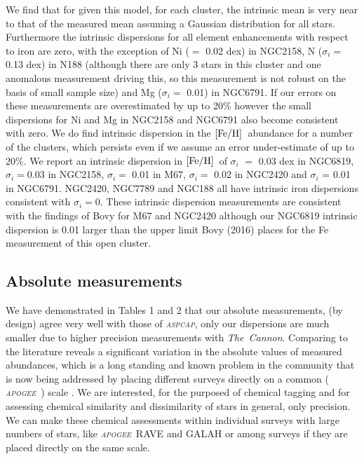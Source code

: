 \documentclass[14pt, preprint2]{aastex6}
\newcommand{\project}[1]{\textsl{#1}}
\newcommand{\tc}{\project{The~Cannon}}
\newcommand{\apogee}{\project{\textsc{apogee}}}
\newcommand{\aspcap}{\project{\textsc{aspcap}}}
\newcommand{\feh}{\mbox{$\rm [Fe/H]$}}
\begin{document}
We find that for given this model, for each cluster, the intrinsic mean is very near to that of the measured mean assuming a Gaussian distribution for all stars. Furthermore the intrinsic dispersions for all element enhancements with respect to iron are zero, with the exception of Ni ($=$ 0.02 dex) in NGC2158, N ($\sigma_i$$=$ 0.13 dex) in N188 (although there are only 3 stars in this cluster and one anomalous measurement driving this, so this measurement is not robust on the basis of small sample size) and Mg ($\sigma_i$$=$ 0.01) in NGC6791. If our errors on these measurements are overestimated by up to 20\% however the small dispersions for Ni and Mg in NGC2158 and NGC6791 also become consistent with zero. We do find intrinsic dispersion in the \feh\ abundance for a number of the clusters, which persists even if we assume an error under-estimate of up to 20\%. We report an intrinsic dispersion in \feh\ of $\sigma_i$ $=$ 0.03 dex in NGC6819, $\sigma_i$$=$0.03 in NGC2158, $\sigma_i$$=$ 0.01 in M67,  $\sigma_i$$=$ 0.02 in NGC2420 and $\sigma_i$ = 0.01 in NGC6791. NGC2420, NGC7789 and NGC188 all have intrinsic iron dispersions consistent with  $\sigma_i$$=$0. These intrinsic dispersion measurements are consistent with the findings of Bovy for M67 and NGC2420 although our NGC6819 intrinsic dispersion is 0.01 larger than the upper limit Bovy (2016) places for the Fe measurement of this open cluster. 


\subsection{Absolute measurements}

We have demonstrated in Tables 1 and 2 that our absolute measurements, (by design) agree very well with those of \aspcap, only our dispersions are much smaller due to higher precision measurements with \tc. Comparing to the literature reveals a significant variation in the absolute values of measured abundances, which is a long standing and known problem in the community  \citep[e.g.][]{smil2014} that is now being addressed by placing different surveys directly on a common ( \apogee\ ) scale \citep[e.g.][]{Ho2016,Casey2016}. We are interested, for the purposed of chemical tagging and for assessing chemical similarity and dissimilarity of stars in general, only precision. We can make these chemical assessments within individual surveys with large numbers of stars, like \apogee\, RAVE and GALAH or among surveys if they are placed directly on the same scale. 
\end{document}
